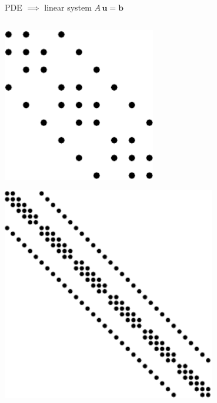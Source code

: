 \documentclass[10pt,
               svgnames,
               hyperref={colorlinks,citecolor=DeepPink4,linkcolor=FireBrick,urlcolor=Maroon},
               usepdftitle=false]{beamer}
\newcommand{\bb}{\mathbf{b}}
\newcommand{\bu}{\mathbf{u}}
\begin{document}
\begin{frame}{PDE $\implies$ linear system $A\,\bu=\bb$}
\begin{columns}
\begin{column}{0.27\textwidth}
\bigskip\medskip
\hfill \includegraphics[width=0.5\textwidth]{images/lapspy5.pdf} \hspace{5mm}

\bigskip
\hfill \includegraphics[width=0.7\textwidth]{images/lapspy8.pdf}

\end{column}
\end{columns}
\end{frame}
\end{document}
